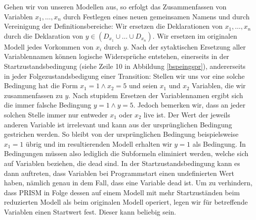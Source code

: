 \documentclass[a4paper]{article}
\theoremstyle{nonumberplain}
\begin{document}
Gehen wir von unseren Modellen aus, so erfolgt das Zusammenfassen von Variablen $x_1, \dots , x_n$ durch Festlegen eines neuen gemeinsamen Namens und durch Vereinigung der Definitionsbereiche: Wir ersetzen die Deklarationen von $x_1, \dots , x_n$ durch die Deklaration von $y \in (D_{x_1} \cup \dots \cup D_{x_n})$. Wir ersetzen im originalen Modell jedes Vorkommen von $x_i$ durch $y$. Nach der sytaktischen Ersetzung aller Variablennamen können logische Widersprüche entstehen, einerseits in der Startzustandsbedingung (siehe Zeile 10 in Abbildung \ref{bspeingspr}), andererseits in jeder Folgezustandsbedigung einer Transition: Stellen wir uns vor eine solche Bedingung hat die Form $x_1 = 1 \land x_2 = 5$ und seien $x_1$ und $x_2$ Variablen, die wir zusammenfassen zu $y$. Nach stupidem Ersetzen der Variablennamen ergibt sich die immer falsche Bedingung $y = 1 \land y = 5$. Jedoch bemerken wir, dass an jeder solchen Stelle immer nur entweder $x_1$ oder $x_2$ live ist. Der Wert der jeweils anderen Variable ist irrelevant und kann aus der ursprünglichen Bedingung gestrichen werden. So bleibt von der ursprünglichen Bedingung beispielsweise $x_1 = 1$ übrig und im resultierenden Modell erhalten wir $y = 1$ als Bedingung. In Bedingungen müssen also lediglich die Subformeln eliminiert werden, welche sich auf Variablen beziehen, die dead sind. In der Startzustandsbedingung kann es dann auftreten, dass Variablen bei Programmstart einen undefinierten Wert haben, nämlich genau in dem Fall, dass eine Variable dead ist. Um zu verhindern, dass PRISM in Folge dessen auf einem Modell mit mehr Startzuständen beim reduzierten Modell als beim originalen Modell operiert, legen wir für betreffende Variablen einen Startwert fest. Dieser kann beliebig sein.

\begin{comment}
	\subsection{Modellreduktion mittels Live Range Analysis}
	
	
	
	Nach Anwendung des Standardverfahrens zur live range analysis erhalten wir die Abbildung
	\begin{equation*}
	\mbox{live\_vars} : V \to 2^{\mbox{Var}} : v \mapsto \mathrm{LIVE}^{out}_{(*,v)}\text{,}
	\end{equation*}
	welche uns zu jedem Zustand $v \in V$ der Kontrollflussvariablen $cf$ die Menge aller Variablen gibt, welche in dem Moment live sind, wenn $cf$ den Wert $v$ annimmt.
	
	Wir bemerken, es besteht nun die Möglichkeit zwei Variablen $x, y$ zu einer Variablen $z$ zusammenzufassen,
	wenn diese in keinem Knoten $v \in V$ beide live sind. Die resultierende zusammengefasste Variable $z$ ist sodann überall live, wo zuvor $x$ oder $y$ live war.
	
\end{comment}
\end{document}
